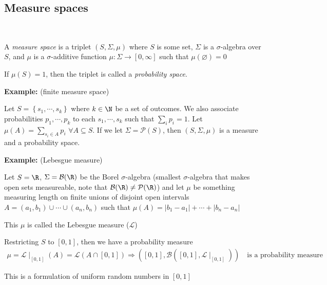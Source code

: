 \subsection{Measure spaces}\hfill\\
\begin{defo}{}
  A \textit{measure space} is a triplet $(S,\Sigma, \mu)$ where $S$ is some set, $\Sigma$ is a $\sigma$-algebra over $S$, and $\mu$ is a $\sigma$-additive function $\mu:\Sigma\to[0,\infty]$ such that $\mu(\varnothing) = 0$
\end{defo}
\par\bigskip
\begin{defo}{}
  If $\mu(S) = 1$, then the triplet is called a \textit{probability space}.
\end{defo}
\par\bigskip
\noindent\textbf{Example:} (finite measure space)\par
\noindent Let $S = \left\{s_1,\cdots,s_k\right\}$ where $k\in\N$ be a set of outcomes. We also associate probabilities $p_1,\cdots,p_k$ to each $s_1,\cdots,s_k$ such that $\sum_i p_i = 1$. Let $\mu(A) = \sum_{s_i\in A}p_i$ $\forall A\subseteq S$. If we let $\Sigma = \mathcal{P}(S)$, then $(S,\Sigma,\mu)$ is a measure and a probability space.
\par\bigskip
\noindent\textbf{Example:} (Lebesgue measure)\par
\noindent Let $S = \R$, $\Sigma = \mathcal{B}(\R)$ be the Borel $\sigma$-algebra (smallest $\sigma$-algebra that makes open sets measureable, note that $\mathcal{B}(\R)\neq\mathcal{P}(\R)$) and let $\mu$ be something measuring length on finite unions of disjoint open intervals $A = (a_1,b_1)\cup\cdots\cup (a_n,b_n)$ such that $\mu(A) = \left|b_1-a_1\right|+\cdots+\left|b_n-a_n\right|$
\par\bigskip
\noindent This $\mu$ is called the Lebesgue measure ($\mathcal{L}$)\par
\noindent Restricting $S$ to $[0,1]$, then we have a probability measure
\begin{equation*}
  \begin{gathered}
    \mu = \mathcal{L}\mid_{[0,1]}(A) = \mathcal{L}(A\cap[0,1])\Rightarrow ([0,1], \mathcal{B}([0,1],\mathcal{L}\mid_{[0,1]}))\quad\text{is a probability measure}
  \end{gathered}
\end{equation*}\par
\noindent This is a formulation of uniform random numbers in $[0,1]$
\par\bigskip
